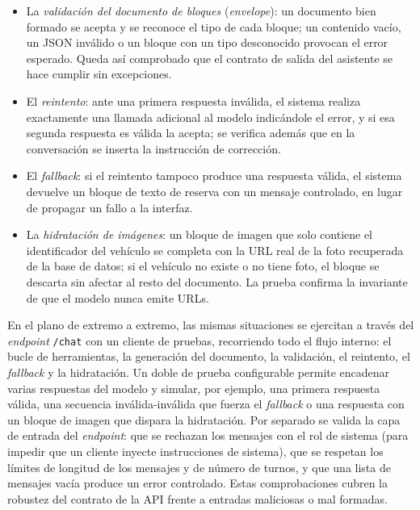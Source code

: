 \begin{itemize}
  \item La \emph{validación del documento de bloques} (\emph{envelope}):
        un documento bien formado se acepta y se reconoce el tipo de cada bloque;
        un contenido vacío, un JSON inválido o un bloque con un tipo desconocido
        provocan el error esperado. Queda así comprobado que el contrato de salida
        del asistente se hace cumplir sin excepciones.

  \item El \emph{reintento}: ante una primera respuesta inválida, el sistema
        realiza exactamente una llamada adicional al modelo indicándole el error,
        y si esa segunda respuesta es válida la acepta; se verifica además que en
        la conversación se inserta la instrucción de corrección.

  \item El \emph{fallback}: si el reintento tampoco produce una respuesta
        válida, el sistema devuelve un bloque de texto de reserva con un mensaje
        controlado, en lugar de propagar un fallo a la interfaz.

  \item La \emph{hidratación de imágenes}: un bloque de imagen que solo contiene
        el identificador del vehículo se completa con la URL real de la foto
        recuperada de la base de datos; si el vehículo no existe o no tiene foto,
        el bloque se descarta sin afectar al resto del documento. La prueba
        confirma la invariante de que el modelo nunca emite URLs.
\end{itemize}

En el plano de extremo a extremo, las mismas situaciones se ejercitan a través
del \emph{endpoint} \texttt{/chat} con un cliente de pruebas, recorriendo todo el
flujo interno: el bucle de herramientas, la generación del documento, la
validación, el reintento, el \emph{fallback} y la hidratación. Un doble de prueba
configurable permite encadenar varias respuestas del modelo y simular, por
ejemplo, una primera respuesta válida, una secuencia inválida-inválida que fuerza
el \emph{fallback} o una respuesta con un bloque de imagen que dispara la
hidratación. Por separado se valida la capa de entrada del \emph{endpoint}: que
se rechazan los mensajes con el rol de sistema (para impedir que un cliente
inyecte instrucciones de sistema), que se respetan los límites de longitud de los
mensajes y de número de turnos, y que una lista de mensajes vacía produce un
error controlado. Estas comprobaciones cubren la robustez del contrato de la API
frente a entradas maliciosas o mal formadas.

